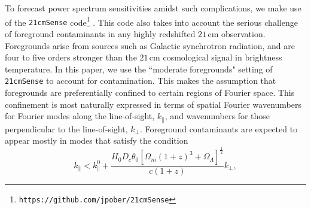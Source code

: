 \documentclass[twocolumn,aps,prd,nofootinbib,showpacs,superscriptaddress]{revtex4-1}
\begin{document}
To forecast power spectrum sensitivities amidst such complications, we make use of the {\tt 21cmSense} code\footnote{{\tt https://github.com/jpober/21cmSense}} \cite{pober_et_al2013,pober_et_al2014}. This code also takes into account the serious challenge of foreground contaminants in any highly redshifted $21\,\textrm{cm}$ observation. Foregrounds arise from sources such as Galactic synchrotron radiation, and are four to five orders stronger than the $21\,\textrm{cm}$ cosmological signal in brightness temperature. In this paper, we use the ``moderate foregrounds" setting of {\tt 21cmSense} to account for contamination. This makes the assumption that foregrounds are preferentially confined to certain regions of Fourier space. This confinement is most naturally expressed in terms of spatial Fourier wavenumbers for Fourier modes along the line-of-sight, $k_\parallel$, and wavenumbers for those perpendicular to the line-of-sight, $k_\perp$. Foreground contaminants are expected to appear mostly in modes that satisfy the condition 
\begin{equation}
\label{eq:Wedge}
k_\parallel < k_\parallel^0 + \frac{H_0 D_c \theta_0 \left[\Omega_m (1+z)^3 + \Omega_\Lambda\right]^\frac{1}{2}}{c (1+z)} k_\perp,
\end{equation}
\end{document}
